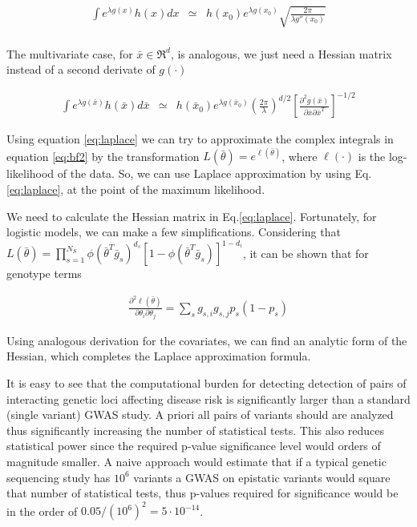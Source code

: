 \begin{eqnarray*}
\int{e^{\lambda g(x)} h(x) dx} & \simeq & h(x_0) e^{\lambda g(x_0)} \sqrt{\frac{2 \pi}{\lambda g''(x_0)}} \\
\end{eqnarray*}

The multivariate case, for $\bar{x} \in \Re^d$, is analogous, we just need a Hessian matrix instead of a second derivate of $g(\cdot)$

\begin{eqnarray}\label{eq:laplace}
\int{e^{\lambda g(\bar{x})} h(\bar{x}) d\bar{x}} & \simeq & h(\bar{x}_0) e^{\lambda g(\bar{x}_0)} 
\left( \frac{2 \pi}{\lambda} \right)^{d/2} \left[ \frac{\partial^2 g(\bar{x}) }{\partial \bar{x} \partial \bar{x}^T} \right] ^{-1/2}
\end{eqnarray}

Using equation \ref{eq:laplace} we can try to approximate the complex integrals in equation \ref{eq:bf2} by the transformation $L(\bar{\theta}) = e^{\ell(\bar{\theta})}$, where $\ell(\cdot)$ is the log-likelihood of the data. So, we can use Laplace approximation by using Eq.\ref{eq:laplace}, at the point of the maximum likelihood.

We need to calculate the Hessian matrix in Eq.\ref{eq:laplace}. Fortunately, for logistic models, we can make a few simplifications. Considering that $L(\bar{\theta}) = \prod_{s=1}^{N_S}{ \phi( \bar{\theta}^T \bar{g}_s)^{d_s} [ 1-\phi( \bar{\theta}^T \bar{g}_s) ]^{1-d_i} }$, it can be shown that for genotype terms

\begin{eqnarray*}
\frac{ \partial^2 \ell(\bar{\theta}) }{ \partial\theta_i \partial\theta_j } 
= \sum_s{ g_{s,i} g_{s,j} p_s (1-p_s) } 
\end{eqnarray*}

Using analogous derivation for the covariates, we can find an analytic form of the Hessian, which completes the Laplace approximation formula.

It is easy to see that the computational burden for detecting detection of pairs of interacting genetic loci affecting disease risk is significantly larger than a standard (single variant) GWAS study. A priori all pairs of variants should are analyzed thus significantly increasing the number of statistical tests. This also reduces statistical power since the required p-value significance level would orders of magnitude smaller. A naive approach would estimate that if a typical genetic sequencing study has $10^6$ variants a GWAS on epistatic variants would square that number of statistical tests, thus p-values required for significance would be in the order of $0.05 / (10^6)^2 = 5 \cdot 10^{-14}$. 

